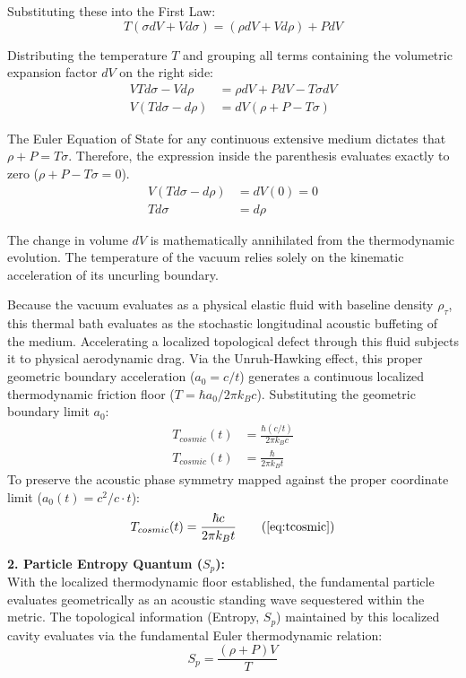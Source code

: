 \documentclass[11pt, a4paper]{article}
\begin{document}
Substituting these into the First Law:
\begin{equation}
    T(\sigma dV + V d\sigma) = (\rho dV + V d\rho) + P dV 
\end{equation}

Distributing the temperature $T$ and grouping all terms containing the volumetric expansion factor $dV$ on the right side:
\begin{align}
    V T d\sigma - V d\rho &= \rho dV + P dV - T \sigma dV  \\
    V (T d\sigma - d\rho) &= dV (\rho + P - T \sigma) 
\end{align}

The Euler Equation of State for any continuous extensive medium dictates that $\rho + P = T \sigma$. Therefore, the expression inside the parenthesis evaluates exactly to zero ($\rho + P - T \sigma = 0$). 
\begin{align}
    V (T d\sigma - d\rho) &= dV (0) = 0  \\
    T d\sigma &= d\rho 
\end{align}

The change in volume $dV$ is mathematically annihilated from the thermodynamic evolution. The temperature of the vacuum relies solely on the kinematic acceleration of its uncurling boundary. 

Because the vacuum evaluates as a physical elastic fluid with baseline density $\rho_{\tau}$, this thermal bath evaluates as the stochastic longitudinal acoustic buffeting of the medium. Accelerating a localized topological defect through this fluid subjects it to physical aerodynamic drag. Via the Unruh-Hawking effect, this proper geometric boundary acceleration ($a_0 = c/t$) generates a continuous localized thermodynamic friction floor ($T = \hbar a_0 / 2\pi k_B c$). Substituting the geometric boundary limit $a_0$:
\begin{align}
    T_{cosmic}(t) &= \frac{\hbar (c/t)}{2\pi k_B c}  \\
    T_{cosmic}(t) &= \frac{\hbar}{2\pi k_B t} 
\end{align}
To preserve the acoustic phase symmetry mapped against the proper coordinate limit ($a_0(t) = c^2 / c\cdot t$):
\begin{equation}
    T_{cosmic}(t) = \frac{\hbar c}{2\pi k_B t} \tag{\ref{eq:tcosmic}}
\end{equation}

\textbf{2. Particle Entropy Quantum ($S_p$):} \\
With the localized thermodynamic floor established, the fundamental particle evaluates geometrically as an acoustic standing wave sequestered within the metric. The topological information (Entropy, $S_p$) maintained by this localized cavity evaluates via the fundamental Euler thermodynamic relation:
\begin{equation}
    S_p = \frac{(\rho + P)V}{T} 
\end{equation}
\end{document}
